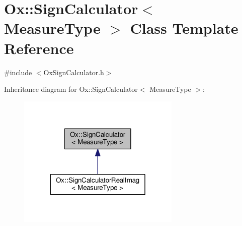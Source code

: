 \hypertarget{class_ox_1_1_sign_calculator}{\section{Ox\-:\-:Sign\-Calculator$<$ Measure\-Type $>$ Class Template Reference}
\label{class_ox_1_1_sign_calculator}
}


{\ttfamily \#include $<$Ox\-Sign\-Calculator.\-h$>$}



Inheritance diagram for Ox\-:\-:Sign\-Calculator$<$ Measure\-Type $>$\-:
\nopagebreak
\begin{figure}[H]
\begin{center}
\leavevmode
\includegraphics[width=220pt]{class_ox_1_1_sign_calculator__inherit__graph}
\end{center}
\end{figure}
